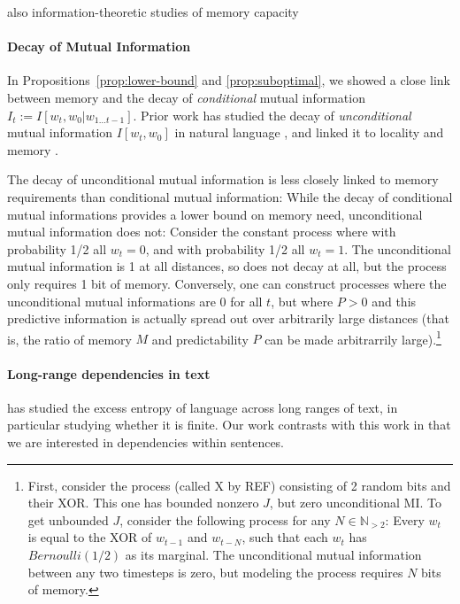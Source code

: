 also information-theoretic studies of memory capacity

\paragraph{Decay of Mutual Information}
In Propositions~\ref{prop:lower-bound} and \ref{prop:suboptimal}, we showed a close link between memory and the decay of \emph{conditional} mutual information $I_t := I[w_t, w_0 | w_{1\dots t-1}]$.
Prior work has studied the decay of \emph{unconditional} mutual information $I[w_t, w_0]$ in natural language \citep{ebeling-entropy-1994,lin-critical-2017}, and linked it to locality and memory \citep{futrell-noisy-context-2017}.

The decay of unconditional mutual information is less closely linked to memory requirements than conditional mutual information:
While the decay of conditional mutual informations provides a lower bound on memory need, unconditional mutual information does not:
Consider the constant process where with probability 1/2 all $w_t = 0$, and with probability 1/2 all $w_t = 1$. %
The unconditional mutual information is 1 at all distances, so does not decay at all, but the process only requires 1 bit of memory.
Conversely, one can construct processes where the unconditional mutual informations are 0 for all $t$, but where $P > 0$ and this predictive information is actually spread out over arbitrarily large distances (that is, the ratio of memory $M$ and predictability $P$ can be made arbitrarrily large).\footnote{First, consider the process (called X by REF) consisting of 2 random bits and their XOR. This one has bounded nonzero $J$, but zero unconditional MI. To get unbounded $J$, consider the following process for any $N \in \mathbb{N}_{>2}$: Every $w_t$ is equal to the XOR of $w_{t-1}$ and $w_{t-N}$, such that each $w_t$ has $Bernoulli(1/2)$ as its marginal. The unconditional mutual information between any two timesteps is zero, but modeling the process requires $N$ bits of memory.}



\paragraph{Long-range dependencies in text}    %
\cite{debowski-excess-2011} has studied the excess entropy of language across long ranges of text, in particular studying whether it is finite. %
Our work contrasts with this work in that we are interested in dependencies within sentences.



